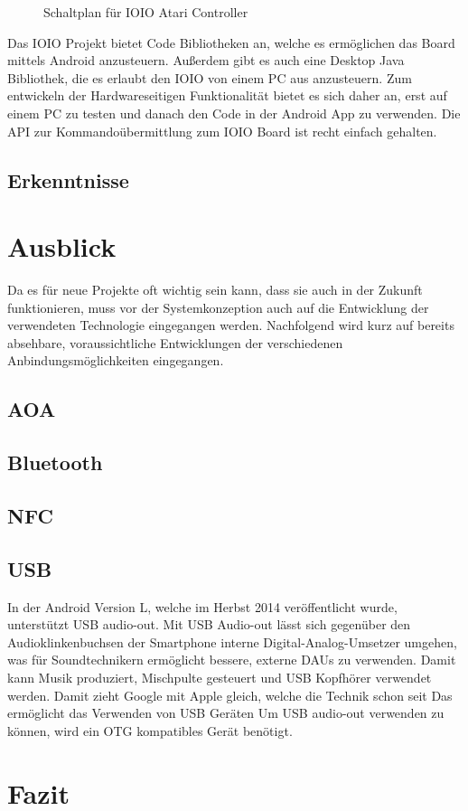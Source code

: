 \documentclass[12pt,journal,compsoc]{IEEEtran}
\begin{document}
\begin{figure}[h]
\def\svgwidth{\columnwidth}

\caption{Schaltplan für IOIO Atari Controller}
\end{figure}




Das IOIO Projekt bietet Code Bibliotheken an, welche es ermöglichen das Board mittels Android anzusteuern.
Außerdem gibt es auch eine Desktop Java Bibliothek, die es erlaubt den IOIO von einem PC aus anzusteuern.
Zum entwickeln der Hardwareseitigen Funktionalität bietet es sich daher an, erst auf einem PC zu testen und danach den Code in der Android App zu verwenden.
Die API zur Kommandoübermittlung zum IOIO Board ist recht einfach gehalten.


\subsection{Erkenntnisse}





\section{Ausblick}
Da es für neue Projekte oft wichtig sein kann, dass sie auch in der Zukunft funktionieren, muss vor der Systemkonzeption auch auf die Entwicklung der verwendeten Technologie eingegangen werden.
Nachfolgend wird kurz auf bereits absehbare, voraussichtliche Entwicklungen der verschiedenen Anbindungsmöglichkeiten eingegangen. 
\subsection{AOA}

\subsection{Bluetooth}

\subsection{NFC}

\subsection{USB}
In der Android Version L, welche im Herbst 2014 veröffentlicht wurde, unterstützt USB audio-out. Mit USB Audio-out lässt sich gegenüber den Audioklinkenbuchsen der Smartphone interne Digital-Analog-Umsetzer umgehen, was für Soundtechnikern ermöglicht bessere, externe DAUs zu verwenden.
Damit kann Musik produziert, Mischpulte gesteuert und USB Kopfhörer verwendet werden.
Damit zieht Google mit Apple gleich, welche die Technik schon seit 
Das ermöglicht das Verwenden von USB Geräten  
Um USB audio-out verwenden zu können, wird ein OTG kompatibles Gerät benötigt.

\section{Fazit}









\nocite{*}
\end{document}
